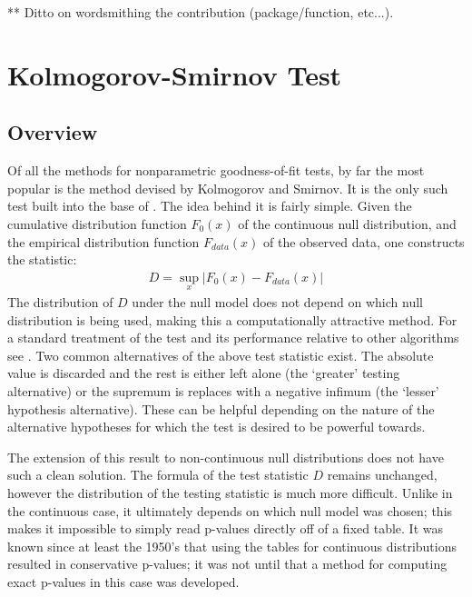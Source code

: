 \documentclass[article]{jss}
\begin{document}
** Ditto on wordsmithing the contribution (package/function, etc...).

\section{Kolmogorov-Smirnov Test}


\subsection{Overview}

Of all the methods for nonparametric goodness-of-fit tests, by far the most popular is the method devised by Kolmogorov and Smirnov.
It is the only such test built into the base of . The idea behind it is fairly simple. Given the cumulative distribution
function $F_0(x)$ of the continuous null distribution, and the empirical distribution function $F_{data}(x)$ of the observed data, 
one constructs the statistic:
\begin{align}
D = \sup_x \left| F_0(x)- F_{data}(x) \right|
\end{align}
The distribution of $D$ under the null model does not depend on which null distribution is being used, making this a computationally
attractive method. For a standard treatment of the test and its performance relative to other algorithms see \cite{slakter65}. Two common
alternatives of the above test statistic exist. The absolute value is discarded and the rest is either left alone (the `greater' testing 
alternative) or the supremum is replaces with a negative infimum (the `lesser' hypothesis alternative). These can be helpful depending 
on the nature of the alternative hypotheses for which the test is desired to be powerful towards.

The extension of this result to non-continuous null distributions does not have such a clean solution. The formula of
the test statistic $D$ remains unchanged, however the distribution of the testing statistic is much more difficult. Unlike in the 
continuous case, it ultimately depends on which null model was chosen; this makes it impossible to simply read p-values directly 
off of a fixed table. It was known since at least the 1950's that using the tables for continuous distributions resulted in 
conservative p-values; it was not until \citet{Conover1972} that a method for computing exact p-values in this case was developed.
\end{document}
